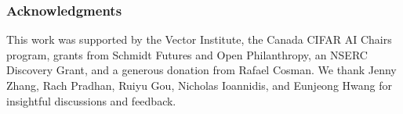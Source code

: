 \documentclass{article} %
\begin{document}
\subsubsection*{Acknowledgments}

This work was supported by the Vector Institute, the Canada CIFAR AI Chairs program, grants from Schmidt Futures and Open Philanthropy, an NSERC Discovery Grant, and a generous donation from Rafael Cosman. We thank Jenny Zhang, Rach Pradhan, Ruiyu Gou, Nicholas Ioannidis, and Eunjeong Hwang for insightful discussions and feedback.




\clearpage
\appendix

\end{document}
